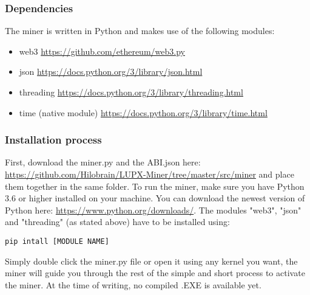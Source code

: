 \documentclass{article}
\begin{document}
\subsubsection{Dependencies}
The miner is written in Python and makes use of the following modules:
\begin{itemize}
    \item web3 \url{https://github.com/ethereum/web3.py}
    \item json \url{https://docs.python.org/3/library/json.html}
    \item threading \url{https://docs.python.org/3/library/threading.html}
    \item time (native module) \url{https://docs.python.org/3/library/time.html}
\end{itemize}

\subsubsection{Installation process}
First, download the miner.py and the ABI.json  here: \url{https://github.com/Hilobrain/LUPX-Miner/tree/master/src/miner} and place them together in the same folder. To run the miner, make sure you have Python 3.6 or higher installed on your machine. You can download the newest version of Python here: \url{https://www.python.org/downloads/}. The modules "web3", "json" and "threading" (as stated above) have to be installed using:
\begin{verbatim}
pip intall [MODULE NAME]    
\end{verbatim}
Simply double click the miner.py file or open it using any kernel you want, the miner will guide you through the rest of the simple and short process to activate the miner. At the time of writing, no compiled .EXE is available yet.
\end{document}
